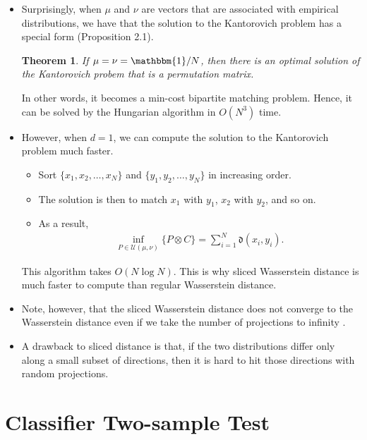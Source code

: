 \documentclass[10pt]{article}
\newtheorem{theorem}[lemma]{Theorem}
\newcommand{\mcal}[1]{\mathcal{#1}}
\begin{document}
\begin{itemize}
    \item Surprisingly, when $\mu$ and $\nu$ are vectors that are associated with empirical distributions, we have that the solution to the Kantorovich problem has a special form \cite{Peyre:2019} (Proposition 2.1).
    
    \begin{theorem}
        If $\mu = \nu = \mathbbm{1}/N$, then there is an optimal solution of the Kantorovich probem that is a permutation matrix.
    \end{theorem}

    In other words, it becomes a min-cost bipartite matching problem. Hence, it can be solved by the Hungarian algorithm in $O(N^3)$ time.

    \item However, when $d = 1$, we can compute the solution to the Kantorovich problem much faster.
    \begin{itemize}
        \item Sort $\{ x_1, x_2, \dotsc, x_N \}$ and $\{ y_1, y_2, \dotsc, y_N \}$ in increasing order.
        \item The solution is then to match $x_1$ with $y_1$, $x_2$ with $y_2$, and so on.
        \item As a result,
        \begin{align*}
            \inf_{P \in \mcal{U}(\mu, \nu)} \{ P  \otimes C \} = \sum_{i=1}^N \mathfrak{d}(x_i, y_i).
        \end{align*}
    \end{itemize}
    This algorithm takes $O(N \log N)$. This is why sliced Wasserstein distance is much faster to compute than regular Wasserstein distance.
    
    \item Note, however, that the sliced Wasserstein distance does not converge to the Wasserstein distance even if we take the number of projections to infinity \cite{Nadjahi:2022}.
    
    \item A drawback to sliced distance is that, if the two distributions differ only along a small subset of directions, then it is hard to hit those directions with random projections.
\end{itemize}

\section{Classifier Two-sample Test}
\end{document}
